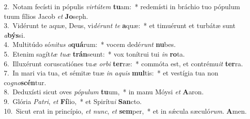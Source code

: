 {2.~}Notam fecísti in pópulis \textit{vir}\textit{tú}\textit{tem} \textbf{tu}am:~* redemísti in bráchio tuo pópulum tuum fílios Jacob \textit{et} \textbf{Jo}seph.\\
{3.~}Vidérunt te aquæ, Deus, vi\textit{dé}\textit{runt} \textit{te} \textbf{a}quæ:~* et timuérunt et turbátæ sunt \textit{a}\textbf{býs}si.\\
{4.~}Multitúdo só\textit{ni}\textit{tus} \textit{a}\textbf{quá}rum:~* vocem dedé\textit{runt} \textbf{nu}bes.\\
{5.~}Etenim sagít\textit{tæ} \textit{tu}\textit{æ} \textbf{trán}seunt:~* vox tonítrui tui \textit{in} \textbf{ro}ta.\\
{6.~}Illuxérunt coruscatiónes tu\textit{æ} \textit{or}\textit{bi} \textbf{ter}ræ:~* commóta est, et contrému\textit{it} \textbf{ter}ra.\\
{7.~}In mari via tua, et sémitæ tuæ \textit{in} \textit{a}\textit{quis} \textbf{mul}tis:~* et vestígia tua non co\textit{gno}\textbf{scén}tur.\\
{8.~}Deduxísti sicut oves \textit{pó}\textit{pu}\textit{lum} \textbf{tu}um,~* in manu Móysi \textit{et} \textbf{A}aron.\\
{9.~}Glória \textit{Pa}\textit{tri}, \textit{et} \textbf{Fí}lio,~* et Spirítu\textit{i} \textbf{San}cto.\\
{10.~}Sicut erat in princípio, \textit{et} \textit{nunc}, \textit{et} \textbf{sem}per,~* et in sǽcula sæculó\textit{rum}. \textbf{A}men.\\
